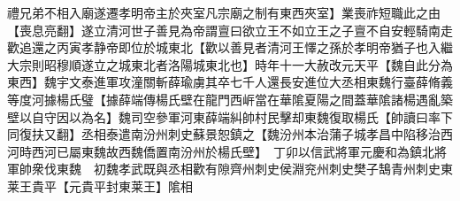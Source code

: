 禮兄弟不相入廟遂遷孝明帝主於夾室凡宗廟之制有東西夾室】業喪祚短職此之由【喪息亮翻】遂立清河世子善見為帝謂亶曰欲立王不如立王之子亶不自安輕騎南走歡追還之丙寅孝静帝即位於城東北【歡以善見者清河王懌之孫於孝明帝猶子也入繼大宗則昭穆順遂立之城東北者洛陽城東北也】時年十一大赦改元天平【魏自此分為東西】魏宇文泰進軍攻潼關斬薛瑜虜其卒七千人還長安進位大丞相東魏行臺薛脩義等度河據楊氏璧【據薛端傳楊氏壁在龍門西㟁當在華隂夏陽之間蓋華隂諸楊遇亂築壁以自守因以為名】魏司空參軍河東薛端糾帥村民擊却東魏復取楊氏【帥讀曰率下同復扶又翻】丞相泰遣南汾州刺史蘇景恕鎮之【魏汾州本治蒲子城孝昌中陷移治西河時西河已屬東魏故西魏僑置南汾州於楊氏壁】　丁卯以信武將軍元慶和為鎮北將軍帥衆伐東魏　初魏孝武既與丞相歡有隙齊州刺史侯淵兖州刺史樊子鵠青州刺史東莱王貴平【元貴平封東莱王】隂相